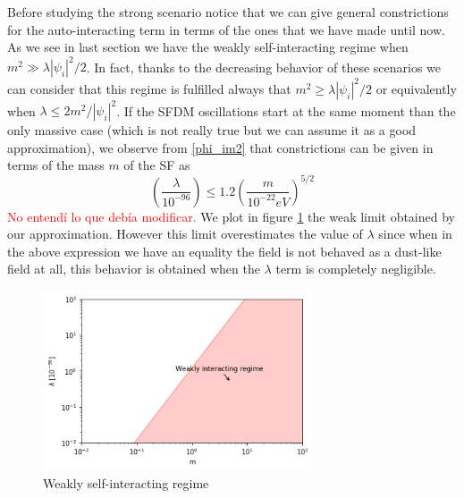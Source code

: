 \documentclass[amssymb,twocolumn,prd,nofootinbib,showpacs]{revtex4-1}
\begin{document}
Before studying the strong scenario notice that we can give general constrictions for the auto-interacting term in terms of the ones that we have made until now. As we see in last section we have the weakly self-interacting regime when $m^2\gg \lambda|\psi_i|^2/2$. In fact, thanks to the decreasing behavior of these scenarios we can consider that this regime is fulfilled always that $m^2\geq \lambda|\psi_i|^2/2$ or equivalently when $\lambda\leq 2m^2/|\psi_i|^2$. If the SFDM oscillations start at the same moment than the only massive case (which is not really true but we can assume it as a good approximation), we observe from \eqref{phi_im2} that constrictions can be given in terms of the mass $m$ of the SF as
\begin{equation}
\left(\frac{\lambda}{10^{-96}}\right)\leq 1.2\left(\frac{m}{10^{-22}eV}\right)^{5/2}
\end{equation}
\textcolor{red}{No entend\'i lo que deb\'ia modificar.} We plot in figure \ref{weekregime} the weak limit obtained by our approximation. However this limit overestimates the value of $\lambda$ since when in the above expression we have an equality the field is not behaved as a dust-like field at all, this behavior is obtained when the $\lambda$ term is completely negligible.
\begin{figure}
\includegraphics[width=8cm]{weakregime.png}
\caption{Weakly self-interacting regime}
\label{weekregime}
\end{figure} 
\end{document}
